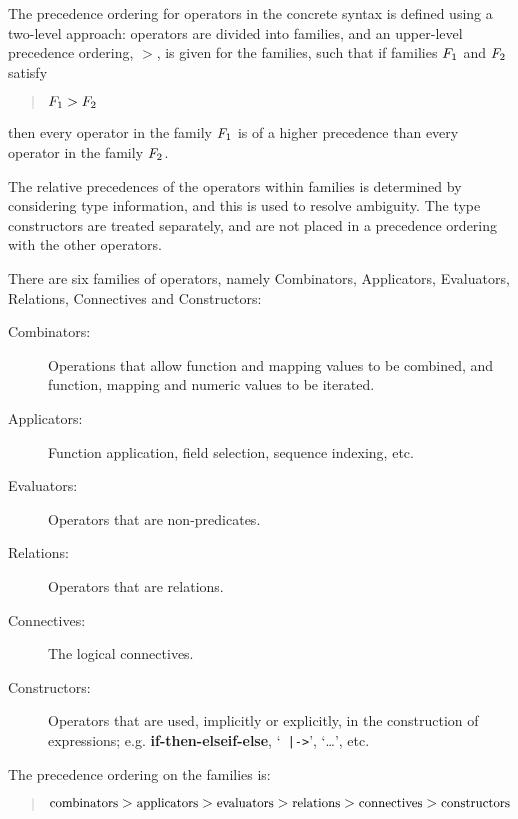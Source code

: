 \documentclass{overturerepchap}
\newcommand{\keyw}[1]{{\bf\ttfamily #1}}
\begin{document}
{The precedence ordering for operators in the concrete syntax is defined
using a two-level approach: operators are divided into families, and an
upper-level precedence ordering, $>$, is given for the families, such that
if families $F\sb{1}$ and $F\sb{2}$ satisfy

\begin{quote}
$F\sb{1} > F\sb{2}$
\end{quote}

\noindent then every operator in the family $F\sb{1}$ is of a higher precedence
than every operator in the family $F\sb{2}$.

The relative precedences of the operators within families is determined by
considering type information, and this is used to resolve ambiguity. The
type constructors are treated separately, and are not placed in a
precedence ordering with the other operators.

There are six families of operators, namely Combinators, Applicators,
Evaluators, Relations, Connectives and Constructors:

\begin{description}%
\item[Combinators:] Operations that allow function and mapping values to be
  combined, and function, mapping and numeric values to be iterated.

\item[Applicators:] Function application, field selection, sequence
  indexing, etc.

\item[Evaluators:] Operators that are non-predicates.

\item[Relations:] Operators that are relations.

\item[Connectives:] The logical connectives.

\item[Constructors:] Operators that are used, implicitly or explicitly, in
  the construction of expressions; e.g.  \keyw{if-then-elseif-else}, `{\tt
    |->}', `\ldots', etc.
\end{description}

\noindent The precedence ordering on the families is:

\begin{quote}
$\mbox{\small combinators} >
\mbox{\small applicators} >
\mbox{\small evaluators}  >
\mbox{\small relations}   >
\mbox{\small connectives} >
\mbox{\small constructors}$
\end{quote}

}
\end{document}
